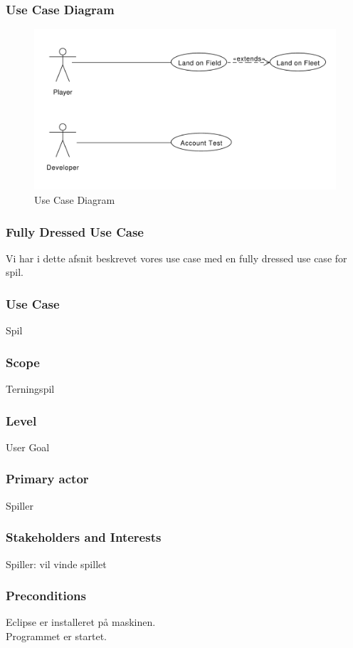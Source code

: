 \subsubsection{Use Case Diagram}
\begin{figure}[ht]
\centering
\includegraphics[scale=0.5]{UseCase.pdf}
\caption[<Text for the list of figures>]{Use Case Diagram}
\label{fig:figure 2}
\end{figure}
\newpage
\subsubsection{Fully Dressed Use Case}
Vi har i dette afsnit beskrevet vores use case med en fully dressed use case for spil.
\subsubsection*{Use Case}
Spil
\subsubsection*{Scope}
Terningspil
\subsubsection*{Level}
User Goal
\subsubsection*{Primary actor}
Spiller
\subsubsection*{Stakeholders and Interests}
Spiller: vil vinde spillet
\subsubsection*{Preconditions}
Eclipse er installeret på maskinen.
\\
Programmet er startet.
